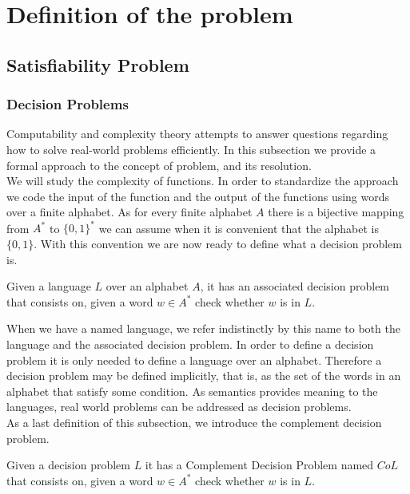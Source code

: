 \chapter{Definition of the problem}
\section{Satisfiability Problem}
\subsection{Decision Problems}
Computability and complexity theory attempts to answer questions regarding how to solve real-world problems efficiently. In this subsection we provide a formal approach to the concept of problem, and its resolution.\\

We will study the complexity of functions. In order to standardize the approach we code the input of the function and the output of the functions using words over a finite alphabet. As for every finite alphabet $A$ there is a bijective mapping from $A^*$ to $\{0,1\}^*$ we can assume when it is convenient that the alphabet is $\{0,1\}$. With this convention we are now ready to define what a decision problem is.

\begin{definition}
  Given a language $L$ over an alphabet $A$, it has an associated decision problem that consists on, given a word $w\in A^*$ check whether $w$ is in $L$. 	
\end{definition}


When we have a named language, we refer indistinctly by this name to both the language and the associated decision problem. In order to define a decision problem it is only needed to define a language over an alphabet. Therefore a decision problem may be defined implicitly, that is, as the set of the words in an alphabet that satisfy some condition. As semantics provides meaning to the languages, real world problems can be addressed as decision problems.\\

As a last definition of this subsection, we introduce the complement decision problem.
\begin{definition}\label{def:complement}
  Given a decision problem  $L$ it has a Complement Decision Problem named $CoL$ that consists on, given a word $w\in A^*$ check whether $w$ is in $L$. 	
\end{definition}

